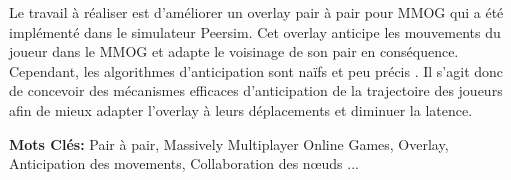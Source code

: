 {		Le travail à réaliser est d'améliorer un overlay pair à pair pour MMOG qui a été implémenté dans le simulateur Peersim. Cet overlay anticipe les mouvements du joueur dans le MMOG et adapte le voisinage de son pair en conséquence. Cependant, les algorithmes d’anticipation sont naïfs et peu précis .
Il s’agit donc de concevoir des mécanismes efficaces d’anticipation de la trajectoire des joueurs afin de mieux adapter l’overlay à leurs déplacements et diminuer la latence.\\}

\textbf{Mots Clés:} Pair à pair, Massively Multiplayer Online Games, Overlay, Anticipation des movements, Collaboration des nœuds ...
